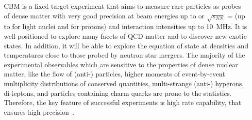 \gls{CBM} is a fixed target experiment that aims to measure rare particles as probes of dense matter with very good precision at beam energies up to  or $\sqrt{s_{NN}}$ =  (up to  for light nuclei and  for protons) and interaction intensities up to 10~MHz.
\newpage
It is well positioned to explore many facets of \gls{QCD} matter and to discover new exotic states. In addition, it will be able to explore the equation of state at densities and temperatures close to those probed by neutron star mergers. The majority of the experimental observables which are sensitive to the properties of dense nuclear matter, like the flow of (anti-) particles, higher moments of event-by-event multiplicity distributions of conserved quantities, multi-strange (anti-) hyperons, di-leptons, and particles containing charm quarks are prone to the statistics. Therefore, the key feature of successful experiments is high rate capability, that ensures high precision~\cite{Ablyazimov_2017}. 

